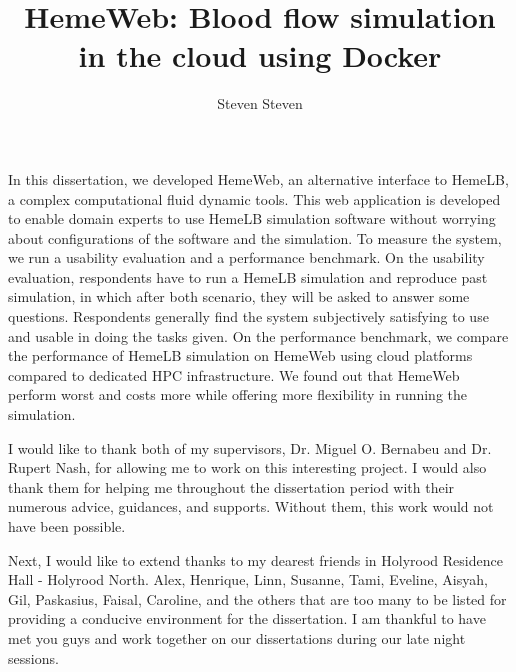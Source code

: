 \documentclass[msc,logo]{infthesis}  %
\title{HemeWeb: Blood flow simulation in the cloud using Docker}
\author{Steven Steven}
\begin{document}
\begin{preliminary}

\maketitle

\begin{pabstract}

In this dissertation, we developed HemeWeb, an alternative interface to HemeLB, a complex computational fluid dynamic tools. This web application is developed to enable domain experts to use HemeLB simulation software without worrying about configurations of the software and the simulation. To measure the system, we run a usability evaluation and a performance benchmark. On the usability evaluation, respondents have to run a HemeLB simulation and reproduce past simulation, in which after both scenario, they will be asked to answer some questions. Respondents generally find the system subjectively satisfying to use and usable in doing the tasks given. On the performance benchmark, we compare the performance  of HemeLB simulation on HemeWeb using cloud platforms compared to dedicated HPC infrastructure. We found out that HemeWeb perform worst and costs more while offering more flexibility in running the simulation.


\end{pabstract}


\begin{acknowledgements}

I would like to thank both of my supervisors, Dr. Miguel O. Bernabeu and Dr. Rupert Nash, for allowing me to work on this interesting project. I would also thank them for helping me throughout the dissertation period with their numerous advice, guidances, and supports. Without them, this work would not have been possible.

\vspace{1cm}

Next, I would like to extend thanks to my dearest friends in Holyrood Residence Hall - Holyrood North.  Alex, Henrique, Linn, Susanne, Tami, Eveline, Aisyah, Gil, Paskasius, Faisal, Caroline, and the others that are too many to be listed for providing a conducive environment for the dissertation. I am thankful to have met you guys and work together on our dissertations during our late night sessions.




\end{acknowledgements}
\end{preliminary}
\end{document}
